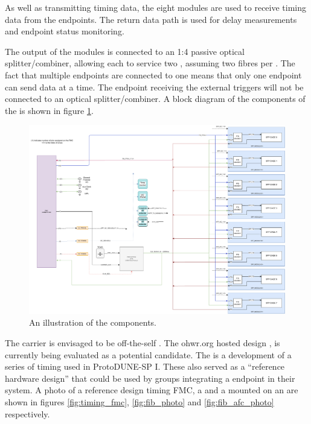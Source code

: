 \documentclass{dune}
\begin{document}
As well as transmitting timing data, the eight  modules are used to receive timing data from the endpoints. The return data path is used for delay measurements and endpoint status monitoring. 

The output of the  modules is connected to an 1:4 passive optical splitter/combiner, allowing each  to service two , assuming two fibres per . The fact that multiple endpoints are connected to one  means that only one endpoint can send  data at a time. The endpoint receiving the external triggers will not be connected to an optical splitter/combiner. A block diagram of the components of the  is shown in figure \ref{fig:fib_and_carrier_layout}.

\begin{figure}[h]
\includegraphics[width=\textwidth]{dune_fib_v2_pc072a.drawio.pdf}
\caption{An illustration of the  components.}
\label{fig:fib_and_carrier_layout}
\end{figure}

The  carrier is envisaged to be off-the-self . The ohwr.org hosted  design \cite{amc_ohwr}, is currently being evaluated as a potential candidate. The  is a development of a series of timing  used in ProtoDUNE-SP I. These  also served as a ``reference hardware design'' that could be used by groups integrating a  endpoint in their system. A photo of a reference design timing FMC, a  and a  mounted on an  are shown in figures \ref{fig:timing_fmc}, \ref{fig:fib_photo} and \ref{fig:fib_afc_photo} respectively.
\end{document}
